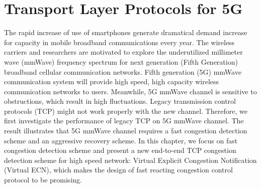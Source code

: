 \chapter{Transport Layer Protocols for 5G}\label{ch:5} 


\par The rapid increase of use of smartphones generate dramatical demand increase for capacity in mobile broadband communications every year. The wireless carriers and researchers are motivated to explore the underutilized millimeter wave (mmWave) frequency spectrum for next generation (Fifth Generation) broadband cellular communication networks. Fifth generation (5G) mmWave communication system will provide high speed, high capacity wireless communication networks to users. Meanwhile, 5G mmWave channel is sensitive to obstructions, which result in high fluctuations. Legacy transmission control protocols (TCP) might not work properly with the new channel. Therefore, we first investigate the performance of legacy TCP on 5G mmWave channel. The result illustrates that 5G mmWave channel requires a fast congestion detection scheme and an aggressive recovery scheme. In this chapter, we focus on fast congestion detection scheme and present a new end-to-end TCP congestion detection scheme for high speed network: Virtual Explicit Congestion Notification (Virtual ECN), which makes the design of fast reacting congestion control protocol to be promising. 
